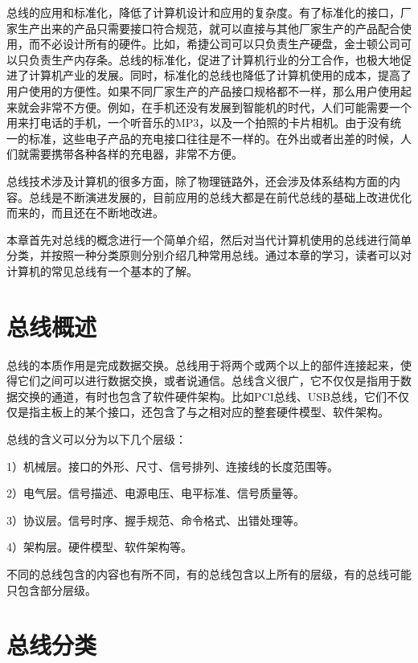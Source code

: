 \documentclass[]{ctexbook}
\begin{document}
总线的应用和标准化，降低了计算机设计和应用的复杂度。有了标准化的接口，厂家生产出来的产品只需要接口符合规范，就可以直接与其他厂家生产的产品配合使用，而不必设计所有的硬件。比如，希捷公司可以只负责生产硬盘，金士顿公司可以只负责生产内存条。总线的标准化，促进了计算机行业的分工合作，也极大地促进了计算机产业的发展。同时，标准化的总线也降低了计算机使用的成本，提高了用户使用的方便性。如果不同厂家生产的产品接口规格都不一样，那么用户使用起来就会非常不方便。例如，在手机还没有发展到智能机的时代，人们可能需要一个用来打电话的手机，一个听音乐的MP3，以及一个拍照的卡片相机。由于没有统一的标准，这些电子产品的充电接口往往是不一样的。在外出或者出差的时候，人们就需要携带各种各样的充电器，非常不方便。

总线技术涉及计算机的很多方面，除了物理链路外，还会涉及体系结构方面的内容。总线是不断演进发展的，目前应用的总线大都是在前代总线的基础上改进优化而来的，而且还在不断地改进。

本章首先对总线的概念进行一个简单介绍，然后对当代计算机使用的总线进行简单分类，并按照一种分类原则分别介绍几种常用总线。通过本章的学习，读者可以对计算机的常见总线有一个基本的了解。

\hypertarget{ux603bux7ebfux6982ux8ff0}{%
\section{总线概述}\label{ux603bux7ebfux6982ux8ff0}}

总线的本质作用是完成数据交换。总线用于将两个或两个以上的部件连接起来，使得它们之间可以进行数据交换，或者说通信。总线含义很广，它不仅仅是指用于数据交换的通道，有时也包含了软件硬件架构。比如PCI总线、USB总线，它们不仅仅是指主板上的某个接口，还包含了与之相对应的整套硬件模型、软件架构。

总线的含义可以分为以下几个层级：

1）机械层。接口的外形、尺寸、信号排列、连接线的长度范围等。

2）电气层。信号描述、电源电压、电平标准、信号质量等。

3）协议层。信号时序、握手规范、命令格式、出错处理等。

4）架构层。硬件模型、软件架构等。

不同的总线包含的内容也有所不同，有的总线包含以上所有的层级，有的总线可能只包含部分层级。

\hypertarget{ux603bux7ebfux5206ux7c7b}{%
\section{总线分类}\label{ux603bux7ebfux5206ux7c7b}}
\end{document}

